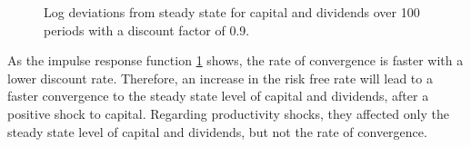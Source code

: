 \documentclass[12pt]{report}
\begin{document}
\begin{figure}[!h]
    \centering
    \caption{Log deviations from steady state for capital and dividends over 100 periods with a discount factor of 0.9.}
    \label{fig:impulse_response2}
\end{figure}
As the impulse response function \ref{fig:impulse_response2} shows, the rate of convergence is faster with a lower discount rate. Therefore,
an increase in the risk free rate will lead to a faster convergence to the steady state level of capital and dividends,
after a positive shock to capital.
Regarding productivity shocks, they affected only the steady state level of capital and dividends, but not the rate of convergence.
\end{document}
